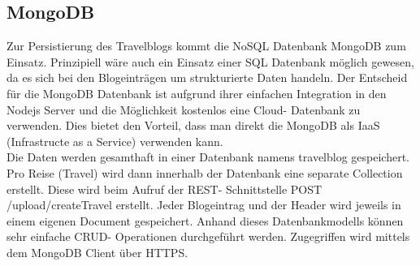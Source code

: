 \documentclass[../main.tex]{subfiles}
\begin{document}
\subsection{MongoDB}
Zur Persistierung des Travelblogs kommt die NoSQL Datenbank MongoDB zum Einsatz. Prinzipiell wäre auch ein Einsatz einer SQL Datenbank möglich gewesen, da es sich bei den Blogeinträgen um strukturierte Daten handeln. Der Entscheid für die MongoDB Datenbank ist aufgrund ihrer einfachen Integration in den Nodejs Server und die Möglichkeit kostenlos eine Cloud- Datenbank zu verwenden. Dies bietet den Vorteil, dass man direkt die MongoDB als IaaS (Infrastructe as a Service) verwenden kann.\\
Die Daten werden gesamthaft in einer Datenbank namens travelblog gespeichert. Pro Reise (Travel) wird dann innerhalb der Datenbank eine separate Collection erstellt. Diese wird beim Aufruf der REST- Schnittstelle POST /upload/createTravel erstellt. Jeder Blogeintrag und der Header wird jeweils in einem eigenen Document gespeichert. Anhand dieses Datenbankmodells können sehr einfache CRUD- Operationen durchgeführt werden. Zugegriffen wird mittels dem MongoDB Client über HTTPS.
\end{document}

